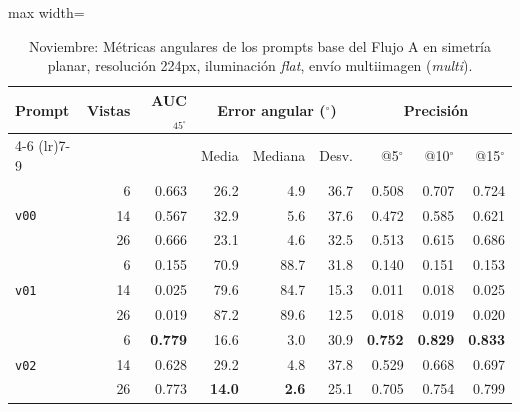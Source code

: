 



\begin{table}[htbp]
\centering
\caption{Noviembre: Métricas angulares de los prompts base del Flujo A en simetría planar, resolución 224px, iluminación \textit{flat}, envío multiimagen (\textit{multi}).}
\label{tab:nov_plane_base_angular}
\begin{lrbox}{\tablebox}
\begin{adjustbox}{max width=\textwidth}
\begin{tabular}{lrrrrrrrr}
\toprule
\multirow{2}{*}{Prompt} & \multirow{2}{*}{Vistas} & \multirow{2}{*}{AUC$_{45^\circ}$} & \multicolumn{3}{c}{Error angular ($^\circ$)} & \multicolumn{3}{c}{Precisión} \\
\cmidrule(lr){4-6} \cmidrule(lr){7-9}
 &  &  & Media & Mediana & Desv. & @5$^\circ$ & @10$^\circ$ & @15$^\circ$ \\
\midrule
\multirow{3}{*}{\texttt{v00}} & 6 & 0.663 & 26.2 & 4.9 & 36.7 & 0.508 & 0.707 & 0.724 \\
 & 14 & 0.567 & 32.9 & 5.6 & 37.6 & 0.472 & 0.585 & 0.621 \\
 & 26 & 0.666 & 23.1 & 4.6 & 32.5 & 0.513 & 0.615 & 0.686 \\
\midrule
\multirow{3}{*}{\texttt{v01}} & 6 & 0.155 & 70.9 & 88.7 & 31.8 & 0.140 & 0.151 & 0.153 \\
 & 14 & 0.025 & 79.6 & 84.7 & 15.3 & 0.011 & 0.018 & 0.025 \\
 & 26 & 0.019 & 87.2 & 89.6 & 12.5 & 0.018 & 0.019 & 0.020 \\
\midrule
\multirow{3}{*}{\texttt{v02}} & 6 & \textbf{0.779} & 16.6 & 3.0 & 30.9 & \textbf{0.752} & \textbf{0.829} & \textbf{0.833} \\
 & 14 & 0.628 & 29.2 & 4.8 & 37.8 & 0.529 & 0.668 & 0.697 \\
 & 26 & 0.773 & \textbf{14.0} & \textbf{2.6} & 25.1 & 0.705 & 0.754 & 0.799 \\
\midrule

\end{tabular}
\end{adjustbox}
\end{lrbox}
\end{table}
